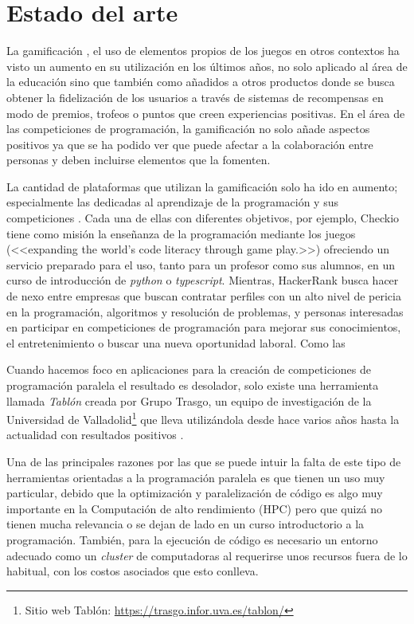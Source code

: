 \documentclass[11pt,spanish,listoffigures,listoftables]{tfgetsinf}
\begin{document}
\chapter{Estado del arte}

La gamificación \cite{article-defining-gamification}, el uso de elementos propios de los juegos en otros contextos ha visto un aumento en su utilización en los últimos años, no solo aplicado al área de la educación sino que también como añadidos a otros productos donde se busca obtener la fidelización de los  usuarios a través de sistemas de recompensas en modo de premios, trofeos o puntos que creen experiencias positivas. En el área de las competiciones de programación, la gamificación no solo añade aspectos positivos ya que se ha podido ver que puede afectar a la colaboración entre personas \cite{article-improving-collaborative} y deben incluirse elementos que la fomenten.

La cantidad de plataformas que utilizan la gamificación solo ha ido en aumento; especialmente las dedicadas al aprendizaje de la programación y sus competiciones \cite{article-programing-competition-platforms}. Cada una de ellas con diferentes objetivos, por ejemplo, Checkio tiene como misión la enseñanza de la programación mediante los juegos (<<expanding the world’s code literacy through game play.>>) ofreciendo un servicio preparado para el uso, tanto para un profesor como sus alumnos, en un curso de introducción de \textit{python} o \textit{typescript}. Mientras, HackerRank busca hacer de nexo entre empresas que buscan contratar perfiles con un alto nivel de pericia en la programación, algoritmos y resolución de problemas, y personas interesadas en participar en competiciones de programación para mejorar sus conocimientos, el entretenimiento o buscar una nueva oportunidad laboral. Como las 

Cuando hacemos foco en aplicaciones para la creación de competiciones de programación paralela el resultado es desolador, solo existe una herramienta llamada \textit{Tablón} creada por Grupo Trasgo, un equipo de investigación de la Universidad de Valladolid\footnote{Sitio web Tablón: \url{https://trasgo.infor.uva.es/tablon/}} que lleva utilizándola desde hace varios años hasta la actualidad con resultados positivos \cite{article-applying-gamification}.

Una de las principales razones por las que se puede intuir la falta de este tipo de herramientas orientadas a la programación paralela es que tienen un uso muy particular, debido que la optimización y paralelización de código es algo muy importante en la Computación de alto rendimiento (HPC) pero que quizá no tienen mucha relevancia o se dejan de lado en un curso introductorio a la programación. También, para la ejecución de código es necesario un entorno adecuado como un \textit{cluster} de computadoras al requerirse unos recursos fuera de lo habitual, con los costos asociados que esto conlleva.
\end{document}
